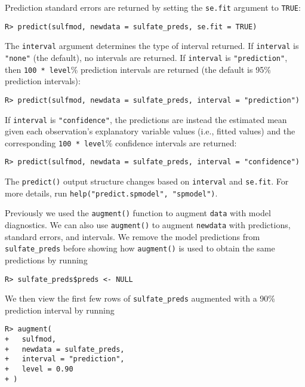 \documentclass[10pt,letterpaper]{article}
\begin{document}
Prediction standard errors are returned by setting the \texttt{se.fit}
argument to \texttt{TRUE}:

\begin{verbatim}
R> predict(sulfmod, newdata = sulfate_preds, se.fit = TRUE)
\end{verbatim}

\noindent The \texttt{interval} argument determines the type of interval
returned. If \texttt{interval} is \texttt{"none"} (the default), no
intervals are returned. If \texttt{interval} is \texttt{"prediction"},
then \texttt{100\ *\ level}\% prediction intervals are returned (the
default is 95\% prediction intervals):

\begin{verbatim}
R> predict(sulfmod, newdata = sulfate_preds, interval = "prediction")
\end{verbatim}

\noindent If \texttt{interval} is \texttt{"confidence"}, the predictions
are instead the estimated mean given each observation's explanatory
variable values (i.e., fitted values) and the corresponding
\texttt{100\ *\ level}\% confidence intervals are returned:

\begin{verbatim}
R> predict(sulfmod, newdata = sulfate_preds, interval = "confidence")
\end{verbatim}

\noindent The \texttt{predict()} output structure changes based on
\texttt{interval} and \texttt{se.fit}. For more details, run
\texttt{help("predict.spmodel",\ "spmodel")}.

Previously we used the \texttt{augment()} function to augment
\texttt{data} with model diagnostics. We can also use \texttt{augment()}
to augment \texttt{newdata} with predictions, standard errors, and
intervals. We remove the model predictions from \texttt{sulfate\_preds}
before showing how \texttt{augment()} is used to obtain the same
predictions by running

\begin{verbatim}
R> sulfate_preds$preds <- NULL
\end{verbatim}

\noindent We then view the first few rows of \texttt{sulfate\_preds}
augmented with a 90\% prediction interval by running

\begin{verbatim}
R> augment(
+   sulfmod,
+   newdata = sulfate_preds,
+   interval = "prediction",
+   level = 0.90
+ )
\end{verbatim}
\end{document}
